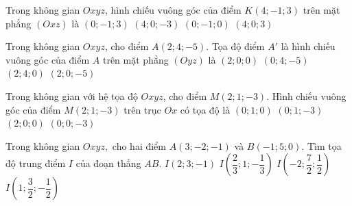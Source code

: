 \begin{ex}%
	Trong không gian $Oxyz$, hình chiếu vuông góc của điểm $K(4;-1;3)$ trên mặt phẳng $(Oxz)$ là
	\choice
	{$(0;-1;3)$}
	{$(4;0;-3)$}
	{$(0;-1;0)$}
	{\True $(4;0;3)$}
\end{ex}

\begin{ex}%
	Trong không gian $Oxyz$, cho điểm $A(2;4;-5)$. Tọa độ điểm $A'$ là hình chiếu vuông góc của điểm $A$ trên mặt phẳng $(Oyz)$ là
	\choice
	{$(2;0;0)$}
	{\True $(0;4;-5)$}
	{$(2;4;0)$}
	{$(2;0;-5)$}
\end{ex}

\begin{ex}%
	Trong không gian với hệ tọa độ $Oxyz$, cho điểm $M(2;1;-3)$. Hình chiếu vuông góc của điểm $M(2;1;-3)$ trên trục $Ox$ có tọa độ là
	\choice
	{$(0;1;0)$}
	{$(0;1;-3)$}
	{\True $(2;0;0)$}
	{$(0;0;-3)$}
\end{ex}

\begin{ex}%
	Trong không gian $Oxyz,$ cho hai điểm $A(3;-2;-1)$ và $B(-1;5;0).$ Tìm tọa độ trung điểm $I$ của đoạn thẳng $AB.$ 
	\choice
	{$I(2;3;-1)$}
	{$I\left(\dfrac{2}{3};1;-\dfrac{1}{3}\right)$}
	{$I\left(-2;\dfrac{7}{2};\dfrac{1}{2}\right)$}
	{\True $I\left(1;\dfrac{3}{2};-\dfrac{1}{2}\right)$}
\end{ex}

